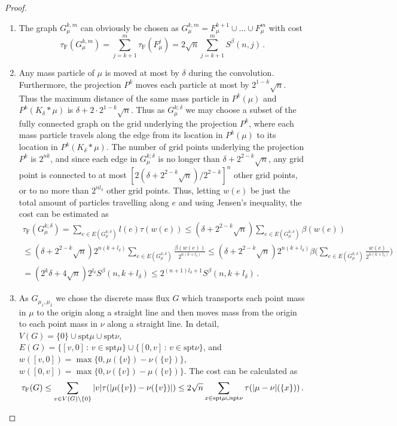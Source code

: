 \documentclass[10pt,a4paper,oneside,final]{article}
\newcommand{\spt}{{\mathrm{spt}}}
\newcommand{\JEnXia}[1][\tau]{#1_{\mathrm{F}}}%
\newcommand{\transportPath}{mass flux}
\numberwithin{equation}{section}
\theoremstyle{plain}
\theoremstyle{definition}
\theoremstyle{remark}
\begin{document}
\begin{proof}
\begin{enumerate}
\item The graph $G_\mu^{k,m}$ can obviously be chosen as $G_\mu^{k,m}=F_{\mu}^{k+1}\cup\ldots\cup F_{\mu}^{m}$ with cost $$\JEnXia(G_\mu^{k,m})=\sum_{j=k+1}^m\JEnXia(F_{\mu}^{j})=2\sqrt n\sum_{j=k+1}^mS^\beta(n,j)\,.$$
\item Any mass particle of $\mu$ is moved at most by $\delta$ during the convolution. Furthermore, the projection $P^k$ moves each particle at most by $2^{1-k}\sqrt n$.
Thus the maximum distance of the same mass particle in $P^k(\mu)$ and $P^k(K_\delta*\mu)$ is $\delta+2\cdot2^{1-k}\sqrt n$.
Thus as $G_\mu^{k;\delta}$ we may choose a subset of the fully connected graph on the grid underlying the projection $P^k$, where each mass particle travels along the edge from its location in $P^k(\mu)$ to its location in $P^k(K_\delta*\mu)$.
The number of grid points underlying the projection $P^k$ is $2^{nk}$, and since each edge in $G_\mu^{k;\delta}$ is no longer than $\delta+2^{2-k}\sqrt n$,
any grid point is connected to at most $[2(\delta+2^{2-k}\sqrt n)/2^{2-k}]^n$ other grid points, or to no more than $2^{nl_\delta}$ other grid points.
Thus, letting $w(e)$ be just the total amount of particles travelling along $e$ and using Jensen's inequality, the cost can be estimated as
\begin{multline*}
\JEnXia(G_\mu^{k;\delta})
=\sum_{e\in E(G_\mu^{k;\delta})}l(e)\tau(w(e))
\leq(\delta+2^{2-k}\sqrt n)\sum_{e\in E(G_\mu^{k;\delta})}\beta(w(e))\\
\leq(\delta+2^{2-k}\sqrt n)2^{n(k+l_\delta)}\sum_{e\in E(G_\mu^{k;\delta})}\tfrac{\beta(w(e))}{2^{n(k+l_\delta)}}
\leq(\delta+2^{2-k}\sqrt n)2^{n(k+l_\delta)}\beta\Big(\sum_{e\in E(G_\mu^{k;\delta})}\tfrac{w(e)}{2^{n(k+l_\delta)}}\Big)\\
=(2^k\delta+4\sqrt n)2^{l_\delta}S^\beta(n,k+l_\delta)
\leq2^{(n+1)l_\delta+1}S^\beta(n,k+l_\delta)\,.
\end{multline*}
\item As $G_{\mu_1,\mu_2}$ we chose the discrete \transportPath{} $G$ which transports each point mass in $\mu$ to the origin along a straight line and then moves mass from the origin to each point mass in $\nu$ along a straight line.
In detail, $V(G)=\{0\}\cup\spt\mu\cup\spt\nu$, $E(G)=\{[v,0]\,:\,v\in\spt\mu\}\cup\{[0,v]\,:\,v\in\spt\nu\}$, and $w([v,0])=\max\{0,\mu(\{v\})-\nu(\{v\})\}$, $w([0,v])=\max\{0,\nu(\{v\})-\mu(\{v\})\}$.
The cost can be calculated as
$$
\JEnXia(G)
\leq\sum_{v\in V(G)\setminus\{0\}}|v|\tau(|\mu(\{v\})-\nu(\{v\})|)
\leq2\sqrt n\sum_{x\in\spt\mu\cup\spt\nu}\tau(|\mu-\nu|(\{x\}))
\,.\qedhere
$$
\end{enumerate}
\end{proof}
\end{document}
